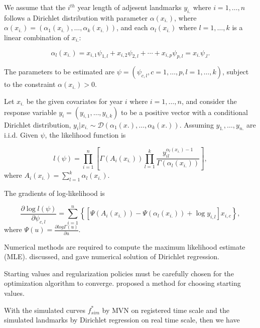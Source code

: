 \documentclass{article}\usepackage[]{graphicx}\usepackage[]{color}
\begin{document}
We assume that the $i^{th}$ year length of adjesent landmarks $y_{i.}$ where $i=1,\dots,n$ follows a Dirichlet distribution with parameter $\alpha(x_{i.})$, where $\alpha(x_{i.})=(\alpha_1(x_{i.}),\dots,\alpha_k(x_{i.}))$, and each $\alpha_l(x_{i.})$ where $l=1,\dots,k$ is a linear combination of $x_{i.}$:

\begin{equation}
\alpha_l(x_{i.}) = x_{i,1}\psi_{1,l} + x_{i,2}\psi_{2,l} +\cdots + x_{i,p}\psi_{p,l} = x_{i.}\psi_{.l}.
\end{equation}

The parameters to be estimated are $\psi=(\psi_{c,l},c=1,\dots,p,l=1,\dots,k)$, subject to the constraint $\alpha(x_{i.})>0$.


Let $x_{i.}$ be the given covariates for year $i$ where $i=1,\dots,n$, and consider the response variable $y_i=(y_{i,1},\dots,y_{i,k})$ to be a positive vector with a conditional Dirichlet distribution, $y_i|x_{i.}\sim \mathcal{D}(\alpha_1(x.),\dots,\alpha_k(x.))$. 
Assuming $y_{1.},\dots,y_{n.}$ are i.i.d. Given $\psi$, the likelihood function is

\begin{equation}
l(\psi) = \prod_{i=1}^{n}\left[\Gamma(A_i(x_{i.}))\prod_{l=1}^k\frac{y_{il}^{\alpha_l(x_{i.})-1}}{\Gamma(\alpha_l(x_{i.}))}\right],
\end{equation}
where $A_i(x_{i.})=\sum_{l=1}^k\alpha_l(x_{i.})$.

The gradients of log-likelihood is 

\begin{equation} 
\frac{\partial \log l(\psi)}{\partial\psi_{c,l}} = \sum_{i=1}^{n}\left\{[\Psi(A_i(x_{i.}))-\Psi(\alpha_l(x_{i.}))+\log y_{i,l}]x_{i,c}\right\},
\end{equation}
where $\Psi(u) = \frac{\partial log\Gamma(u)}{\partial u}$.

\medskip

Numerical methods are required to compute the maximum likelihood estimate (MLE). \citet{camargo2012estimation} discussed, and gave numerical solution of Dirichlet regression. 

Starting values and regularization policies must be carefully chosen for the optimization algorithm to converge. \citet{hijazi2009modelling} proposed a method for choosing starting values. 

\medskip

With the simulated curves $f^{*}_{sim}$ by MVN on registered time scale and the simulated landmarks by Dirichlet regression on real time scale, then we have 
\end{document}
